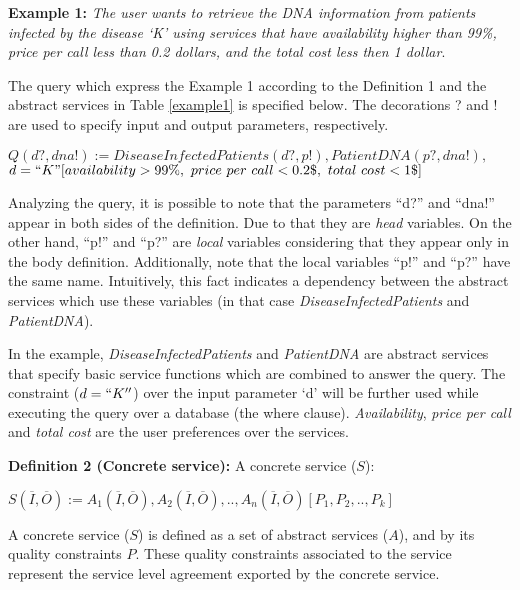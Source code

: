\noindent \textbf{Example 1:} %
\textit{The user wants to retrieve the DNA information from patients infected by the disease `K' using services that have availability higher than 99\%, price per call less than 0.2 dollars, and the total cost less then 1 dollar}.

The query which express the Example 1 according to the Definition 1 and the abstract services in Table \ref{example1} is specified below.
The decorations ? and ! are used to specify input and output parameters, respectively. 

\begin{center}
$Q (d?, dna!) := DiseaseInfectedPatients(d?, p!), PatientDNA(p?, dna!),$ \\
$d = ``K"[availability > 99\%, \ price \ per \ call < 0.2\$, \ total \ cost < 1\$]$
\end{center}  

Analyzing the query, it is possible to note that the parameters ``d?'' and ``dna!'' appear in both sides of the definition.
Due to that they are \textit{head} variables.
On the other hand, ``p!'' and ``p?'' are \textit{local} variables considering that they appear only in the body definition. 
Additionally, note that the local variables ``p!'' and ``p?'' have the same name.
Intuitively, this fact indicates a dependency between the abstract services which use these variables (in that case \textit{DiseaseInfectedPatients} and \textit{PatientDNA}).

In the example, \textit{DiseaseInfectedPatients} and \textit{PatientDNA} are abstract services that specify basic service functions which are combined to answer the query. 
The constraint ($d = ``K''$) over the input parameter `d' will be further used while executing the query over a database (the where clause). 
\textit{Availability}, \textit{price per call} and \textit{total cost} are the user preferences over the services.

\noindent \textbf{Definition 2 (Concrete service):} A concrete service ($S$):
\begin{center}
$S (\overline{I}, \overline{O}) := A_{1}(\overline{I}, \overline{O}), A_{2}(\overline{I}, \overline{O}), ..,  A_{n}(\overline{I}, \overline{O})[P_{1},P_{2}, .., P_{k}]$
\end{center}  
A concrete service ($S$) is defined as a set of abstract services ($A$), and by its quality constraints $P$. 
These quality constraints associated to the service represent the service level agreement exported by the concrete service.


